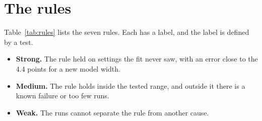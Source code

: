 \documentclass{article}
\begin{document}
\section{The rules}
\label{sec:rules}

Table~\ref{tab:rules} lists the seven rules. Each has a label, and the label is defined by a test.

\begin{itemize}
\item \textbf{Strong.} The rule held on settings the fit never saw, with an error close to the 4.4 points for a new model width.
\item \textbf{Medium.} The rule holds inside the tested range, and outside it there is a known failure or too few runs.
\item \textbf{Weak.} The runs cannot separate the rule from another cause.
\end{itemize}
\end{document}
